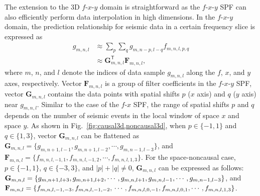 The extension to the 3D $f$-$x$-$y$ domain is straightforward as the
$f$-$x$-$y$ SPF can also efficiently perform data interpolation in
high dimensions.  In the $f$-$x$-$y$ domain, the prediction
relationship for seismic data in a certain frequency slice is
expressed as
\begin{equation}
    \label{eq:fxyar}
    \begin{aligned}
        g_{m,n,l}
         & \approx \sum_{p} \sum_{q} g_{m,n-p,l-q} f_{m,n,l,p,q}       \\
         & \approx \mathbf{G}_{m,n,l}^{\mathsf{T}} \mathbf{F}_{m,n,l},
    \end{aligned}
\end{equation}
where $m$, $n$, and $l$ denote the indices of data sample $g_{m,n,l}$
along the $f$, $x$, and $y$ axes, respectively.  Vector
$\mathbf{F}_{m,n,l}$ is a group of filter coefficients in the
$f$-$x$-$y$ SPF, vector $\mathbf{G}_{m,n,l}$ contains the data points
with spatial shifts $p$ ($x$ axis) and $q$ ($y$ axis) near
$g_{m,n,l}$.  Similar to the case of the $f$-$x$ SPF, the range of
spatial shifts $p$ and $q$ depends on the number of seismic events in
the local window of space $x$ and space $y$.  As shown in
Fig.~\ref{fig:causal3d,noncausal3d}, when $p \in \{ -1, 1\}$ and $q
\in \{ 1, 3\} $, vector $\mathbf{G}_{m,n,l}$ can be flattened as
$\mathbf{G}_{m,n,l} = \{ g_{m,n+1,l-1}, g_{m,n+1,l-2}, \cdots
,g_{m,n-1,l-3}\}$, and $\mathbf{F}_{m,n,l} = \{ f_{m,n,l,-1, 1},
f_{m,n,l,-1, 2}, \cdots ,f_{m,n,l, 1, 3}\}$.  For the space-noncausal
case, $ p \in \{-1, 1\} $, $q \in \{-3, 3\}$, and $\left | p \right |
+ \left | q \right | \neq 0 $, $\mathbf{G}_{m,n,l}$ can be expressed
as follows: $ \mathbf{G}_{m,n,l} = \{ g_{m,n+1,l+3},\\ g_{m,n+1,l+2},
\cdots, g_{m,n,l+1}, g_{m,n,l-1}, \cdots , g_{m,n-1,l-3} \} $, and $
\mathbf{F}_{m,n,l} = \{ f_{m,n,l, -1, -3}, f_{m,n,l, -1, -2},\\
\cdots, f_{m,n,l, 0, -1}, f_{m,n,l, 0, 1}, \cdots, f_{m,n,l, 1, 3}
\}$.

